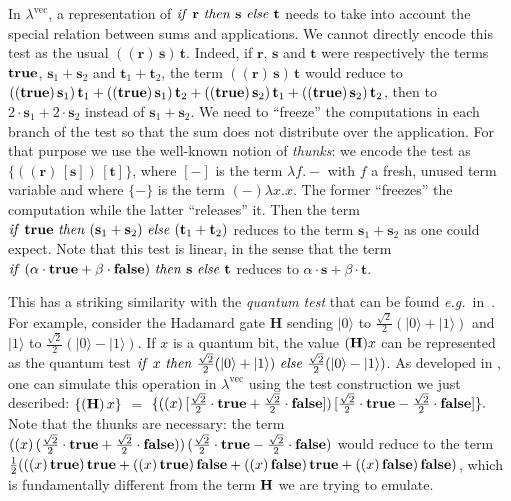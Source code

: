\documentclass[colorlinks=true,linkcolor=black,urlcolor=black,citecolor=blue,submission,copyright,creativecommons]{eptcs}
\newcommand{\lvec}{\ensuremath{\lambda^{\!\!\textrm{vec}}}}
\newcommand{\canon}[1]{[#1]}
\newcommand{\cocanon}[1]{\{#1\}}
\newcommand{\true}{{\bf true}}
\newcommand{\false}{{\bf false}}
\newcommand{\eg}{\emph{e.g.}~}
\newcommand{\ve}[1]{\mathrm{\textbf{#1}}}
\newcommand{\ket}[1]{{|{#1}\rangle}}
\begin{document}
In $\lvec$, a representation of ${\it if}~{\ve r}~{\it then}~{\ve s}~{\it else}~{\ve t}$ needs to take into
account the special relation between sums and applications. We cannot
directly encode this test as the usual $(({\ve r})\,{\ve s})\,{\ve
  t}$. Indeed, if ${\ve r}$, ${\ve s}$ and ${\ve t}$ were respectively
the terms $\true$, ${\ve s}_1+{\ve s}_2$ and ${\ve t}_1+{\ve t}_2$,
the term $(({\ve r})\,{\ve s})\,{\ve t}$ would reduce to
$((\true)\,{\ve s}_1)\,{\ve t}_1 + ((\true)\,{\ve s}_1)\,{\ve t}_2 +
((\true)\,{\ve s}_2)\,{\ve t}_1 +((\true)\,{\ve s}_2)\,{\ve t}_2$,
then to $2\cdot{\ve s}_1 + 2\cdot{\ve s}_2$ instead of ${\ve s}_1 +
{\ve s}_2$.  We need to ``freeze''
the computations in each branch of the test so that the sum does not
distribute over the application. For that purpose we use the
well-known notion of {\em thunks}: we encode the test as
$\cocanon{(({\ve r})\,\canon{{\ve s}})\,\canon{{\ve t}}}$, where
$\canon{-}$ is the term $\lambda f.-$ with $f$ a fresh, unused term
variable and where $\cocanon{-}$ is the term $(-)\lambda x.x$. The
former ``freezes'' the computation while the latter ``releases''
it. Then the term ${\it if}~\true~{\it then}~({\ve s}_1+{\ve
  s}_2)~{\it else}~({\ve t}_1+{\ve t}_2)$ reduces to the term ${\ve
  s}_1+{\ve s}_2$ as one could expect. Note that this test is linear, in the sense that the term ${\it if}~(\alpha\cdot\true+\beta\cdot\false)~{\it
  then}~{\ve s}~{\it else}~{\ve t}$ reduces to $\alpha\cdot{\ve s} + \beta\cdot{\ve t}$.

This has a striking similarity with the {\it quantum test} that can be
found
\eg in~\cite{AltenkirchGrattageLICS05,ArrighiDowekRTA08,tonder04lambda}.
For example, consider the Hadamard gate {\bf H} sending $\ket0$ to $\frac{\sqrt2}2(\ket0+\ket1)$ and $\ket1$ to
$\frac{\sqrt2}2(\ket0-\ket1)$. If $x$ is a quantum bit, the value
$({\bf H})x$ can be represented as the quantum test $ { {\it
    if}~x~{\it then}~\frac{\sqrt2}2(\ket0+\ket1)~{\it
    else}~\frac{\sqrt2}2(\ket0-\ket1)}$. As developed in
\cite{ArrighiDowekRTA08}, one can simulate this operation in $\lvec$ using the test construction we just
described: $ \cocanon{({\bf H})\,x}$ $=$ $\cocanon{
  ((x)\,\canon{\frac{\sqrt2}2\cdot\true+\frac{\sqrt2}2\cdot\false})\,
  \canon{\frac{\sqrt2}2\cdot\true-\frac{\sqrt2}2\cdot\false} }.  $
Note that the thunks are necessary: the term $((x)\,
(\frac{\sqrt2}2\cdot\true+\frac{\sqrt2}2\cdot\false))\,
(\frac{\sqrt2}2\cdot\true-\frac{\sqrt2}2\cdot\false)$ would reduce to the
term $\frac12(((x)\,\true)\,\true + ((x)\,\true)\,\false +
((x)\,\false)\,\true + ((x)\,\false)\,\false)$, which is fundamentally
different from the term ${\bf H}$ we are trying to emulate.
\end{document}
